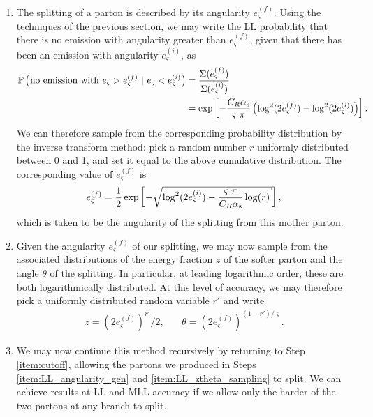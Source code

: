 \begin{enumerate}
    \item
    \label{item:LL_angularity_gen}
    The splitting of a parton is described by its angularity \(e^{(f)}_\varsigma\).
    Using the techniques of the previous section, we may write the LL probability that there is no emission with angularity greater than \(e^{(f)}_\varsigma\), given that there has been an emission with angularity \(e^{(i)}_\varsigma\), as
    \begin{align}
        \label{eq:alg_LLang_ratio}
        \mathbb{P}
        \left(
            {\rm no~emission~with~}e_\varsigma>e^{(f)}_\varsigma
            ~|~
            e_\varsigma < e^{(i)}_\varsigma
        \right)
        &=
        \frac{\Sigma(e^{(f)}_\varsigma)}{\Sigma(e^{(i)}_\varsigma)}
        \\
        \notag
        &=
        \exp\left[
            -\frac{C_R \alphas}{\varsigma~\pi}
            \left(
                \log^2(2 e^{(f)}_\varsigma) - \log^2(2 e^{(i)}_\varsigma)
            \right)
        \right]
        .
    \end{align}
    We can therefore sample from the corresponding probability distribution by the inverse transform method:
    pick a random number \(r\) uniformly distributed between 0 and 1, and set it equal to the above cumulative distribution.
    The corresponding value of \(e^{(f)}_\varsigma\) is
    \begin{align}
        \label{eq:alg_LLang}
        e^{(f)}_\varsigma
        =
        \frac{1}{2}
        \exp\left[
            -\sqrt{\log^2(2 e^{(i)}_\varsigma) - \frac{\varsigma~\pi}{C_R \alphas} \log(r)}
        \right]
        ,
    \end{align}
    which is taken to be the angularity of the splitting from this mother parton.

    \item
    \label{item:LL_ztheta_sampling}
    Given the angularity \(e^{(f)}_\varsigma\) of our splitting, we may now sample from the associated distributions of the energy fraction \(z\) of the softer parton and the angle \(\theta\) of the splitting.
    In particular, at leading logarithmic order, these are both logarithmically distributed.
    At this level of accuracy, we may therefore pick a uniformly distributed random variable \(r'\) and write
    \begin{align}
        z = (2e^{(f)}_\varsigma)^{r'}/2
        ,
        ~~~~~~~~
        \theta = (2e^{(f)}_\varsigma)^{(1-r')/\varsigma}
        .
    \end{align}


    \item
    We may now continue this method recursively by returning to Step \ref{item:cutoff}, allowing the partons we produced in Steps \ref{item:LL_angularity_gen} and \ref{item:LL_ztheta_sampling} to split.
    We can achieve results at LL and MLL accuracy if we allow only the harder of the two partons at any branch to split.
\end{enumerate}



